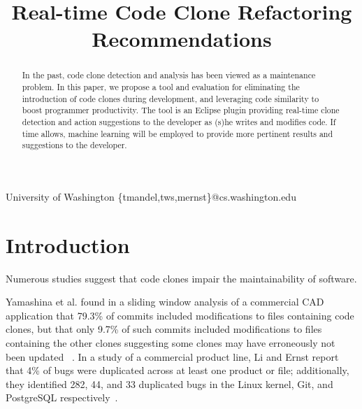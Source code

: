 \documentclass[preprint,10pt]{sigplanconf}
\begin{document}
%

\title{Real-time Code Clone Refactoring Recommendations}
           {University of Washington}
           {\{tmandel,tws,mernst\}@cs.washington.edu}

\maketitle
\begin{abstract}
In the past, code clone detection and analysis has been viewed as a
maintenance problem. In this paper, we propose a tool and evaluation
for eliminating the introduction of code clones during development,
and leveraging code similarity to boost programmer productivity. The tool
is an Eclipse plugin providing real-time clone detection and action
suggestions to the developer as (s)he writes and modifies
code. If time allows, machine learning will be 
employed to provide more pertinent results
and suggestions to the developer.
\end{abstract}



\section{Introduction}
\label{sec:intro}
Numerous studies suggest that code clones impair the maintainability
of software.

Yamashina et al. found in a sliding window analysis of a commercial CAD
application that 79.3\% of commits included modifications to files
containing code clones, but that only 9.7\% of such commits included
modifications to files containing the other
clones suggesting some clones may have erroneously not been updated
~\cite{Yamashina2008}. 
In a study of a commercial product line, Li and Ernst report that 4\%
of bugs were duplicated across at least one product or file;
additionally, they identified 282, 44, and 33 duplicated bugs in the
Linux kernel, Git, and PostgreSQL respectively~\cite{LiE2011}.
\end{document}
